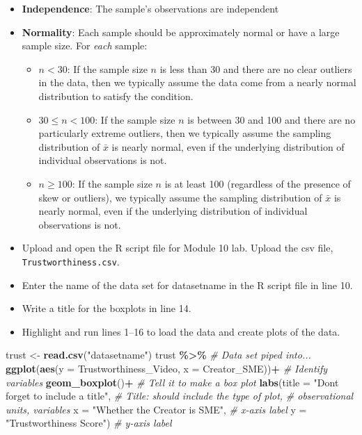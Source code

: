 \documentclass[
]{report}
\newenvironment{Shaded}{\begin{snugshade}}{\end{snugshade}}
\newcommand{\AttributeTok}[1]{\textcolor[rgb]{0.13,0.29,0.53}{#1}}
\newcommand{\CommentTok}[1]{\textcolor[rgb]{0.56,0.35,0.01}{\textit{#1}}}
\newcommand{\FunctionTok}[1]{\textcolor[rgb]{0.13,0.29,0.53}{\textbf{#1}}}
\newcommand{\NormalTok}[1]{#1}
\newcommand{\OtherTok}[1]{\textcolor[rgb]{0.56,0.35,0.01}{#1}}
\newcommand{\SpecialCharTok}[1]{\textcolor[rgb]{0.81,0.36,0.00}{\textbf{#1}}}
\newcommand{\StringTok}[1]{\textcolor[rgb]{0.31,0.60,0.02}{#1}}
\begin{document}
\begin{itemize}
\item
  \textbf{Independence}: The sample's observations are independent
\item
  \textbf{Normality}: Each sample should be approximately normal or have a large sample size. For \emph{each} sample:

  \begin{itemize}
  \item
    \(n < 30\): If the sample size \(n\) is less than 30 and there are no clear outliers in the data, then we typically assume the data come from a nearly normal distribution to satisfy the condition.
  \item
    \(30 \le n < 100\): If the sample size \(n\) is between 30 and 100 and there are no particularly extreme outliers, then we typically assume the sampling distribution of \(\bar{x}\) is nearly normal, even if the underlying distribution of individual observations is not.
  \item
    \(n \geq 100\): If the sample size \(n\) is at least 100 (regardless of the presence of skew or outliers), we typically assume the sampling distribution of \(\bar{x}\) is nearly normal, even if the underlying distribution of individual observations is not.
  \end{itemize}
\item
  Upload and open the R script file for Module 10 lab. Upload the csv file, \texttt{Trustworthiness.csv}.
\item
  Enter the name of the data set for datasetname in the R script file in line 10.
\item
  Write a title for the boxplots in line 14.
\item
  Highlight and run lines 1--16 to load the data and create plots of the data.
\end{itemize}

\begin{Shaded}
\begin{Highlighting}[]
\NormalTok{trust }\OtherTok{\textless{}{-}} \FunctionTok{read.csv}\NormalTok{(}\StringTok{"datasetname"}\NormalTok{)}
\NormalTok{trust }\SpecialCharTok{\%\textgreater{}\%}  \CommentTok{\# Data set piped into...}
  \FunctionTok{ggplot}\NormalTok{(}\FunctionTok{aes}\NormalTok{(}\AttributeTok{y =}\NormalTok{ Trustworthiness\_Video, }\AttributeTok{x =}\NormalTok{ Creator\_SME))}\SpecialCharTok{+}  \CommentTok{\# Identify variables}
  \FunctionTok{geom\_boxplot}\NormalTok{()}\SpecialCharTok{+}  \CommentTok{\# Tell it to make a box plot}
  \FunctionTok{labs}\NormalTok{(}\AttributeTok{title =} \StringTok{"Don\textquotesingle{}t forget to include a title"}\NormalTok{,  }\CommentTok{\# Title: should include the type of plot,}
       \CommentTok{\# observational units, variables}
       \AttributeTok{x =} \StringTok{"Whether the Creator is SME"}\NormalTok{,    }\CommentTok{\# x{-}axis label}
       \AttributeTok{y =} \StringTok{"Trustworthiness Score"}\NormalTok{)  }\CommentTok{\# y{-}axis label}
\end{Highlighting}
\end{Shaded}
\end{document}
